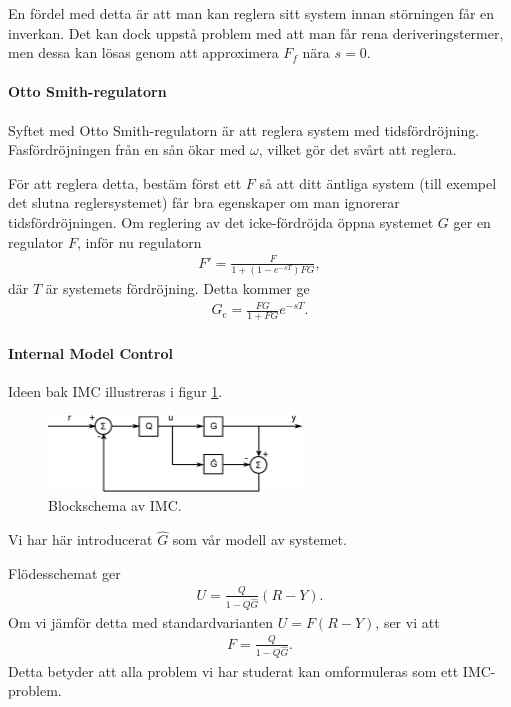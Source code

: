En fördel med detta är att man kan reglera sitt system innan störningen får en inverkan. Det kan dock uppstå problem med att man får rena deriveringstermer, men dessa kan lösas genom att approximera $F_{f}$ nära $s = 0$.

\paragraph{Otto Smith-regulatorn}
Syftet med Otto Smith-regulatorn är att reglera system med tidsfördröjning. Fasfördröjningen från en sån ökar med $\omega$, vilket gör det svårt att reglera.

För att reglera detta, bestäm först ett $F$ så att ditt äntliga system (till exempel det slutna reglersystemet) får bra egenskaper om man ignorerar tidsfördröjningen. Om reglering av det icke-fördröjda öppna systemet $G$ ger en regulator $F$, inför nu regulatorn
\begin{align*}
	F' = \frac{F}{1 +(1 - e^{-sT})FG},
\end{align*}
där $T$ är systemets fördröjning. Detta kommer ge
\begin{align*}
	G_{\text{c}} = \frac{FG}{1 + FG}e^{-sT}.
\end{align*}

\paragraph{Internal Model Control}
Ideen bak IMC illustreras i figur \ref{fig:imc}.
\begin{figure}
	\centering
	\includegraphics[width = 0.6\textwidth]{./Images/imc.eps}
	\caption{Blockschema av IMC.}
	\label{fig:imc}
\end{figure}
Vi har här introducerat $\hat{G}$ som vår modell av systemet.

Flödesschemat ger
\begin{align*}
	U = \frac{Q}{1 - Q\hat{G}}(R - Y).
\end{align*}
Om vi jämför detta med standardvarianten $U = F(R - Y)$, ser vi att
\begin{align*}
	F = \frac{Q}{1 - Q\hat{G}}.
\end{align*}
Detta betyder att alla problem vi har studerat kan omformuleras som ett IMC-problem.

